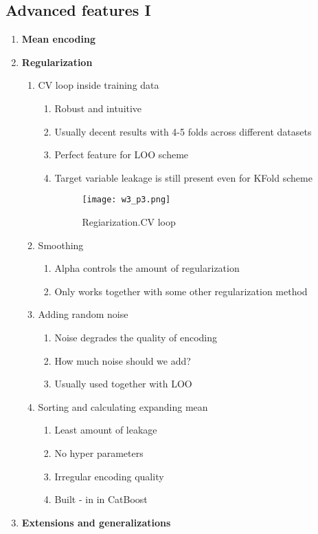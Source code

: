 \documentclass[11pt, twoside]{article}   	%
\begin{document}
 
\subsection{Advanced features I}
 \begin{enumerate}
\item \textbf{Mean encoding} 
\item \textbf{Regularization}
      \begin{enumerate}
      \item CV loop inside training data
       \begin{enumerate}
          \item Robust and intuitive
          \item Usually decent results with 4-5 folds across different datasets
          \item Perfect feature for LOO scheme
          \item Target variable leakage is still present even for KFold scheme
                    \begin{figure}
    [!htb]\centering
    \texttt{[image: w3\_p3.png]}
    \caption{Regiarization.CV loop}
  \label{fig:phase}
  \end{figure}
          \end{enumerate}
      \item Smoothing
       \begin{enumerate}
          \item Alpha controls the amount of regularization
          \item Only works together with some other regularization method
        \end{enumerate}          
      \item Adding random noise
       \begin{enumerate}
          \item Noise degrades the quality of encoding
          \item How much noise should we add?
          \item  Usually used together with LOO
        \end{enumerate}          
      \item Sorting and calculating expanding mean        
       \begin{enumerate}
          \item Least amount of leakage
          \item No hyper parameters
          \item Irregular encoding quality
          \item Built - in in CatBoost 
        \end{enumerate}   
     \end{enumerate}
\item \textbf{Extensions and generalizations}

 \end{enumerate}
\end{document}
